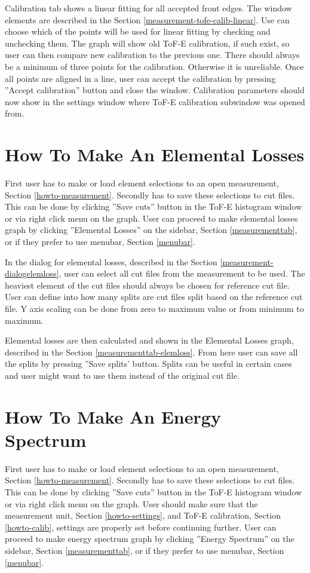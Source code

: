 \documentclass{scrreprt}
\begin{document}
Calibration tab shows a linear fitting for all accepted front edges. 
The window elements are described in the Section \ref{measurement-tofe-calib-linear}.
Use can choose which of the points will be used for linear fitting by checking and unchecking them.
The graph will show old ToF-E calibration, if such exist, so user can then compare new calibration to the previous one.
There should always be a minimum of three points for the calibration. Otherwise it is unreliable.
Once all points are aligned in a line, user can accept the calibration by pressing ''Accept calibration'' button and close the window.
Calibration parameters should now show in the settings window where ToF-E calibration subwindow was opened from.


\section{How To Make An Elemental Losses}\label{howto-elemloss}
First user has to make or load element selections to an open measurement, Section \ref{howto-measurement}.
Secondly has to save these selections to cut files. This can be done by clicking ''Save cuts'' button in the ToF-E histogram window or via right click menu on the graph.
User can proceed to make elemental losses graph by clicking ''Elemental Losses'' on the sidebar, Section \ref{measurementtab}, or if they prefer to use menubar, Section \ref{menubar}.

In the dialog for elemental losses, described in the Section \ref{measurement-dialogelemloss}, user can select all cut files from the measurement to be used.
The heaviest element of the cut files should always be chosen for reference cut file.
User can define into how many splits are cut files split based on the reference cut file.
Y axis scaling can be done from zero to maximum value or from minimum to maximum.

Elemental losses are then calculated and shown in the Elemental Losses graph, described in the Section \ref{measurementtab-elemloss}.
From here user can save all the splits by pressing ''Save splits' button.
Splits can be useful in certain cases and user might want to use them instead of the original cut file.


\section{How To Make An Energy Spectrum}\label{howto-energy}
First user has to make or load element selections to an open measurement, Section \ref{howto-measurement}.
Secondly has to save these selections to cut files. This can be done by clicking ''Save cuts'' button in the ToF-E histogram window or via right click menu on the graph.
User should make sure that the measurement unit, Section \ref{howto-settings}, and ToF-E calibration, Section \ref{howto-calib}, settings are properly set before continuing further.
User can proceed to make energy spectrum graph by clicking ''Energy Spectrum'' on the sidebar, Section \ref{measurementtab}, or if they prefer to use menubar, Section \ref{menubar}.
\end{document}

